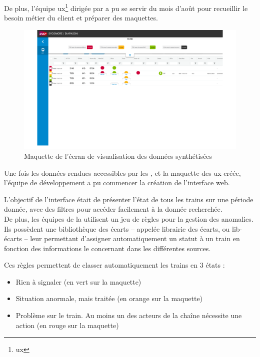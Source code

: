 De plus, l'équipe \gls{ux}\footnote{\glsdesc{ux}} dirigée par \stefan a pu se servir du mois d'août pour recueillir le besoin métier du client et préparer des maquettes.


\begin{figure}[H]
    \centering
    \includegraphics[width=1\linewidth]{img/maquette_home_page.png}
    \caption{Maquette de l'écran de visualisation des données synthétisées}
\end{figure}

Une fois les données rendues accessibles par les \ds, et la maquette des \gls{ux} créée, l'équipe de développement a pu commencer la création de l'interface web.

L'objectif de l'interface était de présenter l'état de tous les trains sur une période donnée, avec des filtres pour accéder facilement à la donnée recherchée.\\
De plus, les équipes de la \sncf utilisent un jeu de règles pour la gestion des anomalies. Ils possèdent une bibliothèque des écarts -- appelée \og librairie des écarts, ou lib-écarts -- leur permettant d'assigner automatiquement un statut à un train en fonction des informations le concernant dans les différentes sources.


Ces règles permettent de classer automatiquement les trains en 3 états :

\begin{itemize}
    \item Rien à signaler (en vert sur la maquette)
    \item Situation anormale, mais traitée (en orange sur la maquette)
    \item Problème sur le train. Au moins un des acteurs de la chaîne nécessite une action (en rouge sur la maquette)
\end{itemize}

